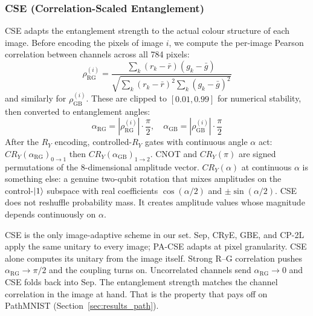 \documentclass[conference,compsoc]{IEEEtran}
\begin{document}
\subsubsection{CSE (Correlation-Scaled Entanglement)}
\label{sec:cse}
CSE adapts the entanglement strength to the actual colour structure of each image.
Before encoding the pixels of image $i$, we compute the per-image Pearson correlation between channels across all 784 pixels:
\begin{equation}
    \rho_\text{RG}^{(i)} = \frac{\sum_k (r_k - \bar{r})(g_k - \bar{g})}{\sqrt{\sum_k (r_k - \bar{r})^2 \sum_k (g_k - \bar{g})^2}}
    \label{eq:pearson}
\end{equation}
and similarly for $\rho_\text{GB}^{(i)}$.
These are clipped to $[0.01, 0.99]$ for numerical stability, then converted to entanglement angles:
\begin{equation}
    \alpha_\text{RG} = |\rho_\text{RG}^{(i)}| \cdot \frac{\pi}{2}, \quad
    \alpha_\text{GB} = |\rho_\text{GB}^{(i)}| \cdot \frac{\pi}{2}
    \label{eq:cse_angles}
\end{equation}
After the $R_Y$ encoding, controlled-$R_Y$ gates with continuous angle $\alpha$ act: $CR_Y(\alpha_\text{RG})_{0\to 1}$ then $CR_Y(\alpha_\text{GB})_{1\to 2}$. CNOT and $CR_Y(\pi)$ are signed permutations of the 8-dimensional amplitude vector. $CR_Y(\alpha)$ at continuous $\alpha$ is something else: a genuine two-qubit rotation that mixes amplitudes on the control-$\ket{1}$ subspace with real coefficients $\cos(\alpha/2)$ and $\pm\sin(\alpha/2)$. CSE does not reshuffle probability mass. It creates amplitude values whose magnitude depends continuously on $\alpha$.

CSE is the only image-adaptive scheme in our set. Sep, CRyE, GBE, and CP-2L apply the same unitary to every image; PA-CSE adapts at pixel granularity. CSE alone computes its unitary from the image itself. Strong R--G correlation pushes $\alpha_\text{RG} \to \pi/2$ and the coupling turns on. Uncorrelated channels send $\alpha_\text{RG} \to 0$ and CSE folds back into Sep. The entanglement strength matches the channel correlation in the image at hand. That is the property that pays off on PathMNIST (Section~\ref{sec:results_path}).
\end{document}
